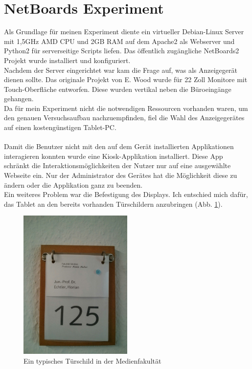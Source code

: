 \section{NetBoards Experiment}\label{NetBoards Experiment}
Als Grundlage für meinen Experiment diente ein virtueller Debian-Linux Server mit 1,5GHz AMD CPU und 2GB RAM auf dem Apache2 als Webserver und Python2 für serverseitige Scripts liefen. Das öffentlich zugängliche NetBoards2 Projekt wurde installiert und konfiguriert.\\
Nachdem der Server eingerichtet war kam die Frage auf, was als Anzeigegerät dienen sollte. Das originale Projekt von E. Wood wurde für 22 Zoll Monitore mit Touch-Oberfläche entworfen. Diese wurden vertikal neben die Büroeingänge gehangen.\\
Da für mein Experiment nicht die notwendigen Ressourcen vorhanden waren, um den genauen Versuchsaufbau nachzuempfinden, fiel die Wahl des Anzeigegerätes auf einen kostengünstigen Tablet-PC.
\\
\\
Damit die Benutzer nicht mit den auf dem Gerät installierten Applikationen interagieren konnten wurde eine Kiosk-Applikation installiert.
Diese App schränkt die Interaktionsmöglichkeiten der Nutzer nur auf eine ausgewählte Webseite ein. Nur der Administrator des Gerätes hat die Möglichkeit diese zu ändern oder die Applikation ganz zu beenden.\\
Ein weiteres Problem war die Befestigung des Displays.
Ich entschied mich dafür, das Tablet an den bereits vorhanden Türschildern anzubringen (Abb. \ref{img:tuerschild}).
\begin{figure}[h!]
  \centering
    \includegraphics[width=0.5\textwidth]{./img/Tuerschild.jpg}
  \caption{Ein typisches Türschild in der Medienfakultät}
  \label{img:tuerschild}
\end{figure}\\

